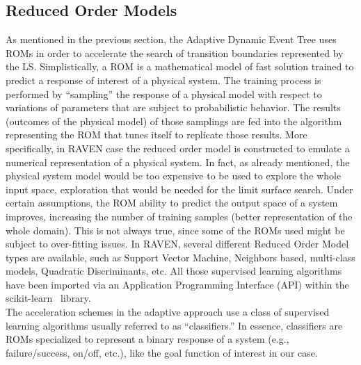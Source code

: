 \subsection{Reduced Order Models} 
\label{sec:ROMs}
As mentioned in the previous section, the Adaptive Dynamic Event Tree uses ROMs in order to accelerate the search of transition boundaries represented by the LS. Simplistically, a ROM is a mathematical model of fast solution trained to predict a response of interest of a physical system. The training process is performed by “sampling” the response of a physical model with respect to variations of parameters that are subject to probabilistic behavior. The results (outcomes of the physical model) of those samplings are fed into the algorithm representing the ROM that tunes itself to replicate those results. More specifically, in RAVEN case the reduced order model is constructed to emulate a numerical representation of a physical system. In fact, as already mentioned, the physical system model would be too expensive to be used to explore the whole input space, exploration that would be needed for the limit surface search. Under certain assumptions, the ROM ability to predict the output space of a system improves, increasing the number of training samples (better representation of the whole domain).  This is not always true, since some of the ROMs used might be subject to over-fitting issues.
In RAVEN, several different Reduced Order Model types are available, such as Support Vector Machine, Neighbors based, multi-class models, Quadratic Discriminants, etc. All those supervised learning algorithms have been imported via an Application Programming Interface (API) within the scikit-learn~\cite{scikitlearn} library.
\\ The acceleration schemes in the adaptive approach use a class of supervised learning algorithms usually referred to as “classifiers.” In essence, classifiers are ROMs specialized to represent a binary response of a system (e.g., failure/success, on/off, etc.), like the goal function of interest in our case.
